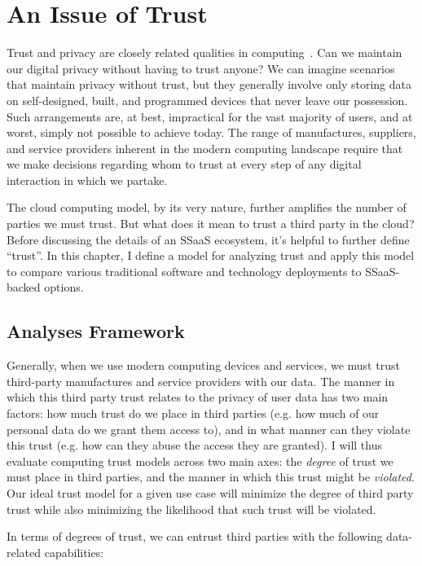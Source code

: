 \chapter{An Issue of Trust}
\label{chap:trust}

Trust and privacy are closely related qualities in
computing~\cite{flowerday2006}. Can we maintain our digital privacy
without having to trust anyone? We can imagine scenarios that maintain
privacy without trust, but they generally involve only storing data on
self-designed, built, and programmed devices that never leave our
possession. Such arrangements are, at best, impractical for the vast
majority of users, and at worst, simply not possible to achieve
today. The range of manufactures, suppliers, and service providers
inherent in the modern computing landscape require that we make
decisions regarding whom to trust at every step of any digital
interaction in which we partake.

The cloud computing model, by its very nature, further amplifies the
number of parties we must trust. But what does it mean to trust a
third party in the cloud? Before discussing the details of an SSaaS
ecosystem, it's helpful to further define ``trust''. In this chapter,
I define a model for analyzing trust and apply this model to compare
various traditional software and technology deployments to SSaaS-backed
options.

\section{Analyses Framework}
\label{chap:trust:framework}

Generally, when we use modern computing devices and services, we must
trust third-party manufactures and service providers with our
data. The manner in which this third party trust relates to the
privacy of user data has two main factors: how much trust do we place
in third parties (e.g. how much of our personal data do we grant them
access to), and in what manner can they violate this trust (e.g. how
can they abuse the access they are granted). I will thus evaluate
computing trust models across two main axes: the \emph{degree} of
trust we must place in third parties, and the manner in which this
trust might be \emph{violated}. Our ideal trust model for a given use
case will minimize the degree of third party trust while also
minimizing the likelihood that such trust will be violated.

In terms of degrees of trust, we can entrust third parties with the
following data-related capabilities:

